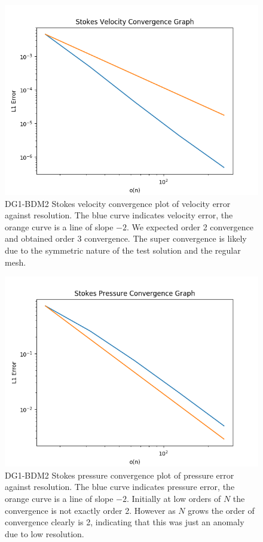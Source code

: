 \documentclass[11pt,twoside,a4paper]{article}
\begin{document}
\begin{figure}
  \includegraphics[width=\linewidth]{stokes_convergence_dbc0.png}
  \caption{DG1-BDM2 Stokes velocity convergence plot of velocity error against resolution. The blue curve indicates velocity error, the orange curve is a line of slope $-2$.  We expected order 2 convergence and obtained order 3 convergence. The super convergence is likely due to the symmetric nature of the test solution and the regular mesh.}
\end{figure}

\begin{figure}
\includegraphics[width=\linewidth]{stokes_pressure_convergence_dbc0.png}
  \caption{DG1-BDM2 Stokes pressure convergence plot of pressure error against resolution. The blue curve indicates pressure error, the orange curve is a line of slope $-2$.  Initially at low orders of $N$ the convergence is not exactly order 2. However as $N$ grows the order of convergence clearly is 2, indicating that this was just an anomaly due to low resolution.}
\end{figure}
\end{document}
